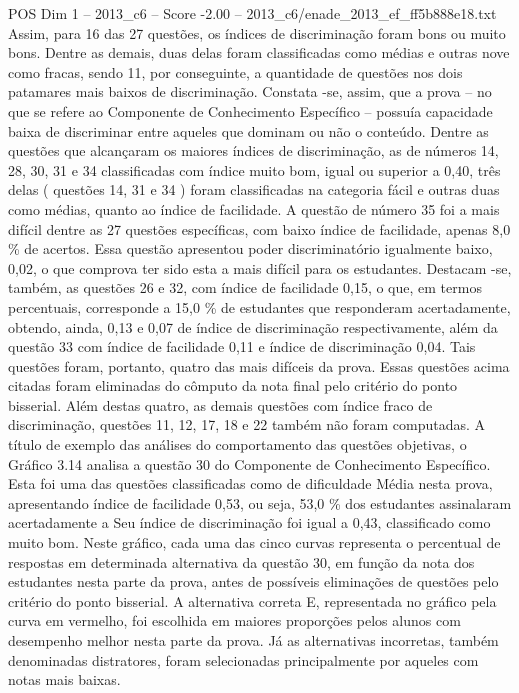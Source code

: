 \begin{textsample}{POS Dim 1 – 2013\_c6 – Score -2.00 – 2013\_c6/enade\_2013\_ef\_ff5b888e18.txt}
Assim, para 16 das 27 questões, os índices de discriminação foram bons ou muito bons.
Dentre as demais, duas delas foram classificadas como médias e outras nove como fracas, sendo 11, por conseguinte, a quantidade de questões nos dois patamares mais baixos de discriminação.
Constata -se, assim, que a prova – no que se refere ao Componente de Conhecimento Específico – possuía capacidade baixa de discriminar entre aqueles que dominam ou não o conteúdo.
Dentre as questões que alcançaram os maiores índices de discriminação, as de números 14, 28, 30, 31 e 34 classificadas com índice muito bom, igual ou superior a 0,40, três delas ( questões 14, 31 e 34 ) foram classificadas na categoria fácil e outras duas como médias, quanto ao índice de facilidade.
A questão de número 35 foi a mais difícil dentre as 27 questões específicas, com baixo índice de facilidade, apenas 8,0 \% de acertos.
Essa questão apresentou poder discriminatório igualmente baixo, 0,02, o que comprova ter sido esta a mais difícil para os estudantes.
Destacam -se, também, as questões 26 e 32, com índice de facilidade 0,15, o que, em termos percentuais, corresponde a 15,0 \% de estudantes que responderam acertadamente, obtendo, ainda, 0,13 e 0,07 de índice de discriminação respectivamente, além da questão 33 com índice de facilidade 0,11 e índice de discriminação 0,04.
Tais questões foram, portanto, quatro das mais difíceis da prova.
Essas questões acima citadas foram eliminadas do cômputo da nota final pelo critério do ponto bisserial.
Além destas quatro, as demais questões com índice fraco de discriminação, questões 11, 12, 17, 18 e 22 também não foram computadas.
A título de exemplo das análises do comportamento das questões objetivas, o Gráfico 3.14 analisa a questão 30 do Componente de Conhecimento Específico.
Esta foi uma das questões classificadas como de dificuldade Média nesta prova, apresentando índice de facilidade 0,53, ou seja, 53,0 \% dos estudantes assinalaram acertadamente a Seu índice de discriminação foi igual a 0,43, classificado como muito bom.
Neste gráfico, cada uma das cinco curvas representa o percentual de respostas em determinada alternativa da questão 30, em função da nota dos estudantes nesta parte da prova, antes de possíveis eliminações de questões pelo critério do ponto bisserial.
A alternativa correta E, representada no gráfico pela curva em vermelho, foi escolhida em maiores proporções pelos alunos com desempenho melhor nesta parte da prova.
Já as alternativas incorretas, também denominadas distratores, foram selecionadas principalmente por aqueles com notas mais baixas.

\end{textsample}

